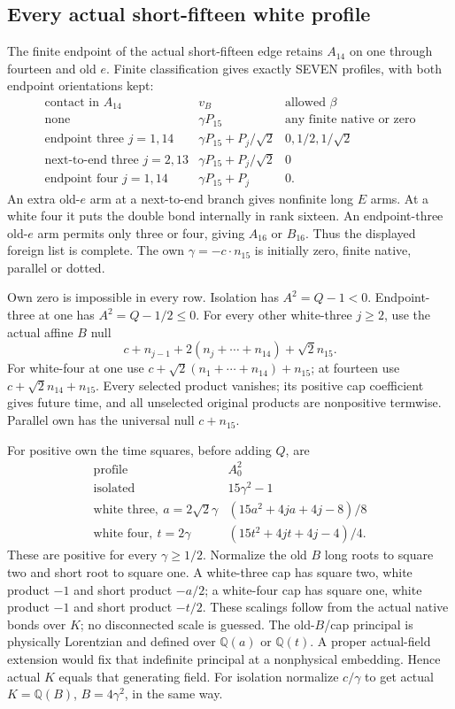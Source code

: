 \subsection{Every actual short-fifteen white profile}
\label{app:arithB15Ishort}

The finite endpoint of the actual short-fifteen edge
retains \(A_{14}\) on one through fourteen and old \(e\).
Finite classification gives exactly SEVEN profiles,
with both endpoint orientations kept:
\[
\begin{array}{c|c|c}
 \text{contact in }A_{14}&v_B&\text{allowed }\beta\\ \hline
 \text{none}&\gamma P_{15}&\text{any finite native or zero}\\
 \text{endpoint three }j=1,14&
       \gamma P_{15}+P_j/\sqrt2&0,1/2,1/\sqrt2\\
 \text{next-to-end three }j=2,13&
       \gamma P_{15}+P_j/\sqrt2&0\\
 \text{endpoint four }j=1,14&
       \gamma P_{15}+P_j&0 .
\end{array}
\]
An extra old-\(e\) arm at a next-to-end branch gives
nonfinite long \(E\) arms.
At a white four it puts the double bond internally
in rank sixteen.
An endpoint-three old-\(e\) arm permits only three
or four, giving \(A_{16}\) or \(B_{16}\).
Thus the displayed foreign list is complete.
The own \(\gamma=-c\cdot n_{15}\) is initially zero,
finite native, parallel or dotted.

Own zero is impossible in every row.
Isolation has \(A^2=Q-1<0\).
Endpoint-three at one has \(A^2=Q-1/2\le0\).
For every other white-three \(j\ge2\), use the actual
affine \(B\) null
\[
              c+n_{j-1}+2(n_j+\cdots+n_{14})+\sqrt2n_{15}.
\]
For white-four at one use
\(c+\sqrt2(n_1+\cdots+n_{14})+n_{15}\);
at fourteen use \(c+\sqrt2n_{14}+n_{15}\).
Every selected product vanishes; its positive cap
coefficient gives future time, and all unselected
original products are nonpositive termwise.
Parallel own has the universal null \(c+n_{15}\).

For positive own the time squares, before adding \(Q\), are
\[
\begin{array}{c|c}
 \text{profile}&A_0^2\\ \hline
 \text{isolated}&15\gamma^2-1\\
 \text{white three},\ a=2\sqrt2\gamma&
               (15a^2+4ja+4j-8)/8\\
 \text{white four},\ t=2\gamma&
               (15t^2+4jt+4j-4)/4 .
\end{array}
\]
These are positive for every \(\gamma\ge1/2\).
Normalize the old \(B\) long roots to square two and
short root to square one.
A white-three cap has square two, white product \(-1\)
and short product \(-a/2\);
a white-four cap has square one, white product \(-1\)
and short product \(-t/2\).
These scalings follow from the actual native bonds over
\(K\); no disconnected scale is guessed.
The old-\(B\)/cap principal is physically Lorentzian
and defined over \(\mathbb Q(a)\) or \(\mathbb Q(t)\).
A proper actual-field extension would fix that
indefinite principal at a nonphysical embedding.
Hence actual \(K\) equals that generating field.
For isolation normalize \(c/\gamma\) to get
actual \(K=\mathbb Q(B)\), \(B=4\gamma^2\), in the same way.

